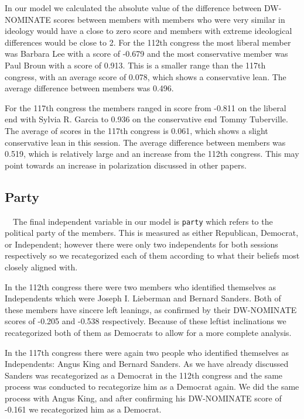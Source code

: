 \documentclass[Royal,times,sageh]{sagej}
\begin{document}
In our model we calculated the absolute value of the difference between
DW-NOMINATE scores between members with members who were very similar in
ideology would have a close to zero score and members with extreme
ideological differences would be close to 2. For the 112th congress the
most liberal member was Barbara Lee with a score of -0.679 and the most
conservative member was Paul Broun with a score of 0.913. This is a
smaller range than the 117th congress, with an average score of 0.078,
which shows a conservative lean. The average difference between members
was 0.496.

For the 117th congress the members ranged in score from -0.811 on the
liberal end with Sylvia R. Garcia to 0.936 on the conservative end Tommy
Tuberville. The average of scores in the 117th congress is 0.061, which
shows a slight conservative lean in this session. The average difference
between members was 0.519, which is relatively large and an increase
from the 112th congress. This may point towards an increase in
polarization discussed in other papers.

\hypertarget{party}{%
\subsection{Party}\label{party}}

\doublespacing

~~The final independent variable in our model is \texttt{party} which
refers to the political party of the members. This is measured as either
Republican, Democrat, or Independent; however there were only two
independents for both sessions respectively so we recategorized each of
them according to what their beliefs most closely aligned with.

In the 112th congress there were two members who identified themselves
as Independents which were Joseph I. Lieberman and Bernard Sanders. Both
of these members have sincere left leanings, as confirmed by their
DW-NOMINATE scores of -0.205 and -0.538 respectively. Because of these
leftist inclinations we recategorized both of them as Democrats to allow
for a more complete analysis.

In the 117th congress there were again two people who identified
themselves as Independents: Angus King and Bernard Sanders. As we have
already discussed Sanders was recategorized as a Democrat in the 112th
congress and the same process was conducted to recategorize him as a
Democrat again. We did the same process with Angus King, and after
confirming his DW-NOMINATE score of -0.161 we recategorized him as a
Democrat.
\end{document}
